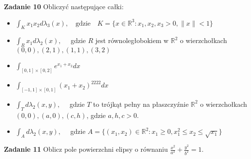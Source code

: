 \documentclass[a4paper,11pt]{article}
\newcommand{\RR}{\mathbb{R}}
\begin{document}
\textbf{Zadanie 10} Obliczyć następujące całki:

\begin{itemize}
  \item $\int_K x_1 x_2 d \lambda_3(x), \quad \text{gdzie} \quad K =
    \{x
    \in \RR^3: x_1,x_2,x_3 > 0,  \|x\| < 1\} $
  \item $\int_{R} x_1 d \lambda_2(x), \quad$ gdzie $R$ jest
    równoległobokiem w $\RR^2$ o wierzchołkach $(0,0),
    (2,1), (1,1),
    (3,2)$
  \item $\int_{[0,1]\times [0,2]} e^{x_1 + x_2}
    dx$ 
  \item $\int_{[-1,1]\times [0,1]} (x_1 +
    x_2)^{2222} dx$ 
  \item $\int_{T} d\lambda_2(x,y),\quad$
    gdzie $T$ to trójkąt pełny na
    płaszczyźnie $\RR^2$ o
    wierzchołkach
    $(0,0),(a,0),(c,h)$, gdzie
    $a,h,c>0$.
  \item  $\int_A
    d\lambda_2(x,y), \quad$
    gdzie  $A=\{(x_1,x_2) \in
      \RR^2:
      x_1 \ge 0, x_1^2
      \le x_2 \le
    \sqrt{x_1} \} $
\end{itemize}

\textbf{Zadanie 11} Oblicz pole powierzchni elipsy o równaniu
$\frac{x^2}{a^2} + \frac{y^2}{b^2} = 1$.
\end{document}
